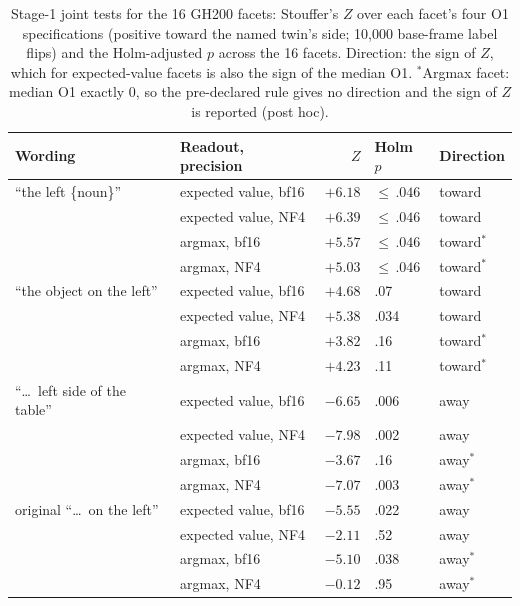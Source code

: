 \documentclass[conference]{IEEEtran}
\begin{document}
\begin{table}[t]
\centering
\scriptsize
\setlength{\tabcolsep}{3pt}
\caption{Stage-1 joint tests for the 16 GH200 facets: Stouffer's $Z$ over each facet's four O1 specifications (positive toward the named twin's side; 10,000 base-frame label flips) and the Holm-adjusted $p$ across the 16 facets. Direction: the sign of $Z$, which for expected-value facets is also the sign of the median O1. $^\ast$Argmax facet: median O1 exactly 0, so the pre-declared rule gives no direction and the sign of $Z$ is reported (post hoc).}
\label{tab:facets}
\begin{tabular}{@{}l l r l l@{}}
\toprule
Wording & Readout, precision & $Z$ & Holm $p$ & Direction\\
\midrule
``the left \{noun\}'' & expected value, bf16 & $+6.18$ & ${\leq}\,.046$ & toward\\
 & expected value, NF4 & $+6.39$ & ${\leq}\,.046$ & toward\\
 & argmax, bf16 & $+5.57$ & ${\leq}\,.046$ & toward$^\ast$\\
 & argmax, NF4 & $+5.03$ & ${\leq}\,.046$ & toward$^\ast$\\
\midrule
``the object on the left'' & expected value, bf16 & $+4.68$ & .07 & toward\\
 & expected value, NF4 & $+5.38$ & .034 & toward\\
 & argmax, bf16 & $+3.82$ & .16 & toward$^\ast$\\
 & argmax, NF4 & $+4.23$ & .11 & toward$^\ast$\\
\midrule
``\dots\ left side of the table'' & expected value, bf16 & $-6.65$ & .006 & away\\
 & expected value, NF4 & $-7.98$ & .002 & away\\
 & argmax, bf16 & $-3.67$ & .16 & away$^\ast$\\
 & argmax, NF4 & $-7.07$ & .003 & away$^\ast$\\
\midrule
original ``\dots\ on the left'' & expected value, bf16 & $-5.55$ & .022 & away\\
 & expected value, NF4 & $-2.11$ & .52 & away\\
 & argmax, bf16 & $-5.10$ & .038 & away$^\ast$\\
 & argmax, NF4 & $-0.12$ & .95 & away$^\ast$\\
\bottomrule
\end{tabular}
\end{table}
\end{document}
